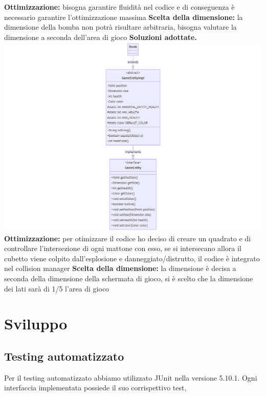 \documentclass[a4paper,12pt]{report}
\begin{document}
\textbf{Ottimizzazione:} bisogna garantire fluidità nel codice e di conseguenza è necessario garantire l'ottimizzazione massima
\newline \textbf{Scelta della dimensione:} la dimensione della bomba non potrà risultare arbitraria, bisogna valutare la dimensione a seconda dell'area di gioco
\textbf{Soluzioni adottate.} \newline
\includegraphics[width=\textwidth]{bomb.png}
\textbf{Ottimizzazione:} per otimizzare il codice ho deciso di creare un quadrato e di controllare l'intersezione di ogni mattone con esso, se si intersecano allora il cubetto viene colpito dall'esplosione e danneggiato/distrutto, il codice è integrato nel collision manager
\newline
\textbf{Scelta della dimensione:} la dimensione è decisa a seconda della dimensione della schermata di gioco, si è scelto che la dimensione dei lati sarà di 1/5 l'area di gioco
\newline
\chapter{Sviluppo}
\section{Testing automatizzato}
Per il testing automatizzato abbiamo utilizzato JUnit nella versione 5.10.1.\newline
Ogni interfaccia implementata possiede il suo corrispettivo test,
\end{document}
